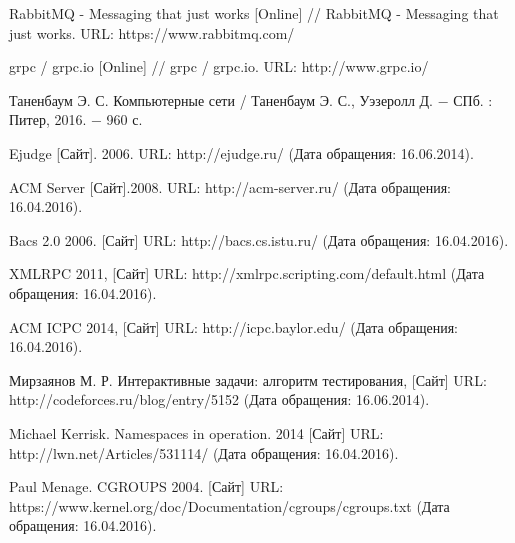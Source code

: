 \begin{thebibliography}{9}

RabbitMQ - Messaging that just works [Online] // RabbitMQ - Messaging that just works. URL: https://www.rabbitmq.com/

grpc / grpc.io [Online] // grpc / grpc.io. URL: http://www.grpc.io/

Таненбаум Э. С. Компьютерные сети / Таненбаум Э. С., Уэзеролл Д. − СПб. : Питер, 2016. − 960 с.

Ejudge [Сайт]. 2006. URL: http://ejudge.ru/ (Дата обращения: 16.06.2014).

ACM Server [Сайт].2008. URL: http://acm-server.ru/ (Дата обращения: 16.04.2016).

Bacs 2.0 2006. [Сайт] URL: http://bacs.cs.istu.ru/ (Дата обращения: 16.04.2016).

XMLRPC 2011, [Сайт] URL: http://xmlrpc.scripting.com/default.html (Дата обращения: 16.04.2016).

ACM ICPC 2014, [Сайт] URL: http://icpc.baylor.edu/ (Дата обращения: 16.04.2016).

Мирзаянов М. Р. Интерактивные задачи: алгоритм тестирования, [Сайт] URL: http://codeforces.ru/blog/entry/5152 (Дата обращения: 16.06.2014).

Michael Kerrisk. Namespaces in operation. 2014 [Сайт] URL: http://lwn.net/Articles/531114/ (Дата обращения: 16.04.2016).

Paul Menage. CGROUPS 2004. [Сайт] URL: https://www.kernel.org/doc/Documentation/cgroups/cgroups.txt (Дата обращения: 16.04.2016).

\end{thebibliography}
